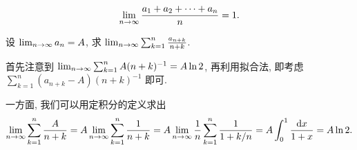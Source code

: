 \begin{exercise}[series=exer]
\begin{align*}
        \lim_{n \to \infty}\frac{a_{1} + a_{2} + \dots + a_{n}}{n} = 1.
    \end{align*}
    \item 设 $ \lim_{n \to \infty} a_{n} = A $, 求 $ \lim_{n \to \infty} \sum_{k=1}^{n} \frac{a_{n+k}}{n+k} $.  
    \begin{hint}
        首先注意到 $ \lim_{n \to \infty}\sum_{k = 1}^{n} A(n + k)^{-1} = A\ln 2 $, 再利用拟合法, 即考虑 $ \sum_{k = 1}^{n} (a_{n + k} - A)(n + k)^{-1} $ 即可. 
    \end{hint}
    \begin{answer}
        一方面, 我们可以用定积分的定义求出
        \begin{align*}
            \lim_{n \to \infty}\sum_{k = 1}^{n}\frac{A}{n + k} = A \lim_{n \to \infty}\sum_{k = 1}^{n} \frac{1}{n + k} = A \lim_{n \to \infty}\frac{1}{n} \sum_{k = 1}^{n}\frac{1}{1 + k/n} = A\int_{0}^{1} \frac{\dd x}{1 + x} = A\ln 2.
        \end{align*}
        

\end{answer}
\end{exercise}
